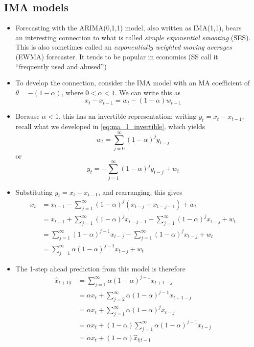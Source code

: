 \documentclass{article}
\begin{document}
\subsection{IMA models}

\begin{itemize}
\item Forecasting with the ARIMA(0,1,1) model, also written as IMA(1,1), bears
  an interesting connection to what is called \emph{simple exponential 
    smooting} (SES). This is also sometimes called an \emph{exponentially
    weighted moving averages} (EWMA) forecaster. It tends to be popular in
  economics (SS call it ``frequently used and abused'')     

\item To develop the connection, consider the IMA model with an MA coefficient
  of $\theta = -(1-\alpha)$, where $0 < \alpha < 1$. We can write this as  
  \[
  x_t - x_{t-1} = w_t - (1-\alpha) w_{t-1}
  \]

\item Because $\alpha < 1$, this has an invertible representation: writing $y_t
  = x_t - x_{t-1}$, recall what we developed in \eqref{eq:ma_1_invertible},
  which yields 
  \[
  w_t = \sum_{j=0}^\infty (1-\alpha)^j y_{t-j} 
  \]
  or
  \[
  y_t = -\sum_{j=1}^\infty (1-\alpha)^j y_{t-j} + w_t
  \]
  
\item Substituting $y_t = x_t - x_{t-1}$, and rearranging, this gives 
  \begin{align*}
  x_t &= x_{t-1} - \sum_{j=1}^\infty (1-\alpha)^j (x_{t-j} - x_{t-j-1}) + w_t \\
  &= x_{t-1} + \sum_{j=1}^\infty (1-\alpha)^j x_{t-j-1} - \sum_{j=1}^\infty
    (1-\alpha)^j x_{t-j} + w_t \\
  &= \sum_{j=1}^\infty (1-\alpha)^{j-1} x_{t-j} - \sum_{j=1}^\infty (1-\alpha)^j
    x_{t-j} + w_t \\
  &= \sum_{j=1}^\infty \alpha (1-\alpha)^{j-1} x_{t-j} + w_t 
  \end{align*}

\item The 1-step ahead prediction from this model is therefore  
  \begin{align*}
  \hat{x}_{t+1 | t} &= \sum_{j=1}^\infty \alpha (1-\alpha)^{j-1} x_{t+1-j} \\  
  &= \alpha x_t + \sum_{j=2}^\infty \alpha (1-\alpha)^{j-1} x_{t+1-j} 
    \\
  &= \alpha x_t + \sum_{j=1}^\infty \alpha (1-\alpha)^j x_{t-j} \\
  &= \alpha x_t + (1-\alpha) \sum_{j=1}^\infty \alpha (1-\alpha)^{j-1}
    x_{t-j} \\
  &= \alpha x_t + (1-\alpha) \hat{x}_{t | t-1}
  \end{align*}


\end{itemize}
\end{document}

